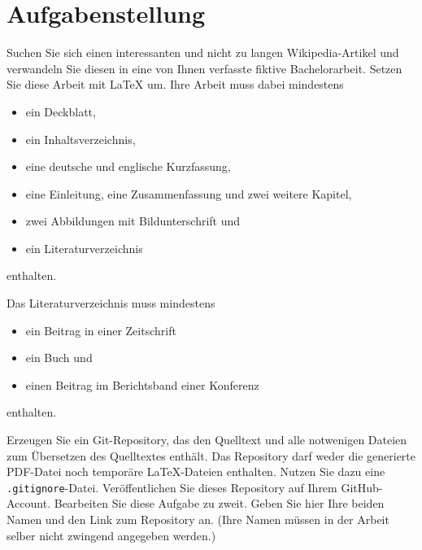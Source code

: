 \cleardoublepage


\section*{Aufgabenstellung}

Suchen Sie sich einen interessanten und nicht zu langen Wikipedia-Artikel und verwandeln Sie diesen in 
eine von Ihnen verfasste fiktive Bachelorarbeit. Setzen Sie diese Arbeit mit LaTeX um. Ihre Arbeit muss 
dabei mindestens

\begin{itemize}
    \item ein Deckblatt,
    \item ein Inhaltsverzeichnis,
    \item eine deutsche und englische Kurzfassung,
    \item eine Einleitung, eine Zusammenfassung und zwei weitere Kapitel,
    \item zwei Abbildungen mit Bildunterschrift und
    \item ein Literaturverzeichnis
\end{itemize}

enthalten.

Das Literaturverzeichnis muss mindestens

\begin{itemize}
    \item ein Beitrag in einer Zeitschrift
    \item ein Buch und
    \item einen Beitrag im Berichtsband einer Konferenz
\end{itemize}

enthalten.

Erzeugen Sie ein Git-Repository, das den Quelltext und alle notwenigen Dateien zum Übersetzen des Quelltextes enthält. Das Repository darf weder die generierte PDF-Datei noch temporäre LaTeX-Dateien enthalten. Nutzen Sie dazu eine \texttt{.gitignore}-Datei. Veröffentlichen Sie dieses Repository auf Ihrem GitHub-Account. Bearbeiten Sie diese Aufgabe zu zweit. Geben Sie hier Ihre beiden Namen und den Link zum Repository an. (Ihre Namen müssen in der Arbeit selber nicht zwingend angegeben werden.)
